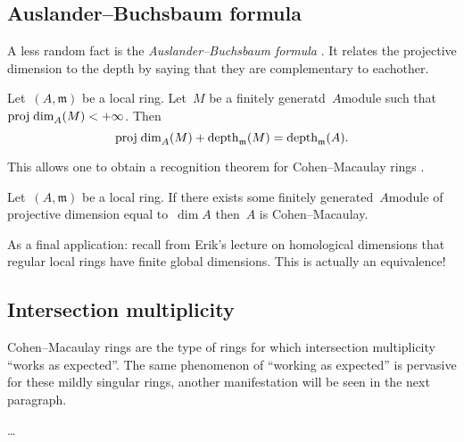 \documentclass[10pt,a4paper]{article}
\begin{document}
\subsection{Auslander--Buchsbaum formula}
\label{subsection:auslander-buchsbaum}
A less random fact is the \emph{Auslander--Buchsbaum formula} \cite[theorem 19.9]{eisenbud-commutative-algebra}. It relates the projective dimension to the depth by saying that they are complementary to eachother.
\begin{theorem}
  Let~$(A,\mathfrak{m})$ be a local ring. Let~$M$ be a finitely generatd~$A$\dash module such that~$\operatorname{proj\;dim}_A(M)<+\infty$. Then
  \begin{equation}
    \operatorname{proj\;dim}_A(M)+\operatorname{depth}_{\mathfrak{m}}(M)=\operatorname{depth}_{\mathfrak{m}}(A).
  \end{equation}
\end{theorem}
This allows one to obtain a recognition theorem for Cohen--Macaulay rings \cite[corollary 19.10]{eisenbud-commutative-algebra}.
\begin{corollary}
  Let~$(A,\mathfrak{m})$ be a local ring. If there exists some finitely generated~$A$\dash module of projective dimension equal to~$\dim A$ then~$A$ is Cohen--Macaulay.
\end{corollary}
As a final application: recall from Erik's lecture on homological dimensions that regular local rings have finite global dimensions. This is actually an equivalence! 

\subsection{Intersection multiplicity}
\label{subsection:intersection-multiplicity}
Cohen--Macaulay rings are the type of rings for which intersection multiplicity ``works as expected''. The same phenomenon of ``working as expected'' is pervasive for these mildly singular rings, another manifestation will be seen in the next paragraph.
\begin{example}
  \ldots
\end{example}
\end{document}
